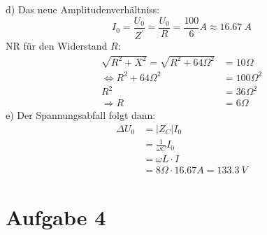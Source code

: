 \documentclass[11pt a4paper]{article}
\begin{document}
\vspace{0.5cm}
d) Das neue Amplitudenverhältniss:
\[ I_0 = \frac{U_0}{Z^\prime} = \frac{U_0}{R} = \frac{100}{6} A \approx 16.67 \ A \]
NR für den Widerstand $R$:
\begin{align*}
	\sqrt{R^2 + X^2} = \sqrt{R^2 + 64 \Omega^2}
	&= 10 \Omega \\
	\Leftrightarrow
	R^2 + 64 \Omega^2
	&= 100 \Omega^2 \\
	R^2 
	&= 36 \Omega^2 \\
	\Rightarrow
	R 
	&= 6 \Omega
\end{align*}
e) Der Spannungsabfall folgt dann:
\begin{align*}
	\Delta U_0
	&= \vert Z_C \vert I_0 \\
	&= \frac{1}{\omega C} I_0 \\
	&= \omega L \cdot I \\
	&= 8 \Omega \cdot 16.67 A = 133.3 \ V
\end{align*}

\newpage

\section*{Aufgabe 4}
\end{document}
